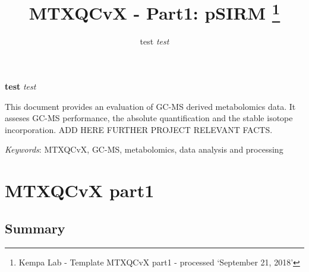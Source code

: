 \documentclass[9pt,]{article}
\title{MTXQCvX - Part1: pSIRM \thanks{Kempa Lab - Template MTXQCvX part1 - processed `September 21, 2018'}  }
\author{\Large test\vspace{0.05in} \newline\normalsize\emph{test}  }
\date{}
\newcommand*{\authorfont}{\fontfamily{phv}\selectfont}
\renewenvironment{abstract}
 {{%
    \setlength{\leftmargin}{0mm}
    \setlength{\rightmargin}{\leftmargin}%
  }%
  \relax}
 {\endlist}
\begin{document}
	
%

{%
\setlength{\parindent}{0pt}
\thispagestyle{plain}
{\fontsize{18}{20}\selectfont\raggedright 
\maketitle  %

}

{
   \vskip 13.5pt\relax \normalsize\fontsize{11}{12} 
\textbf{\authorfont test} \hskip 15pt \emph{\small test}   

}

}



{
\hypersetup{linkcolor=black}
\setcounter{tocdepth}{2}
\tableofcontents
}




\begin{abstract}

    \hbox{\vrule height .2pt width 39.14pc}

    \vskip 8.5pt %

\noindent This document provides an evaluation of GC-MS derived metabolomics data.
It asseses GC-MS performance, the absolute quantification and the stable
isotope incorporation. ADD HERE FURTHER PROJECT RELEVANT FACTS.


\vskip 8.5pt \noindent \emph{Keywords}: MTXQCvX, GC-MS, metabolomics, data analysis and processing \par

    \hbox{\vrule height .2pt width 39.14pc}



\end{abstract}


\vskip 6.5pt

\noindent  \section{MTXQCvX part1}\label{mtxqcvx-part1}

\subsection{Summary}\label{summary}
\end{document}
